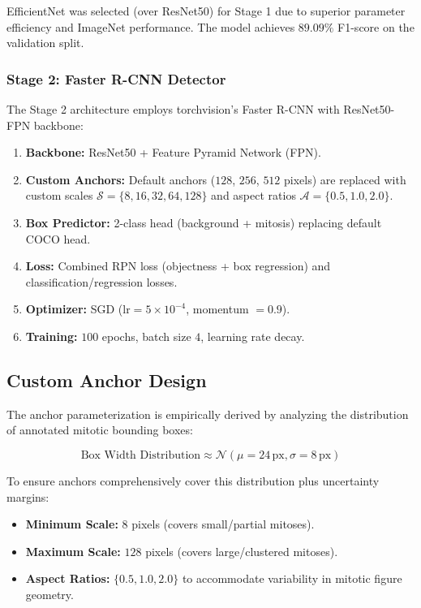\documentclass[journal]{IEEEtran}
\begin{document}
EfficientNet was selected (over ResNet50) for Stage 1 due to superior parameter efficiency and ImageNet performance. The model achieves $89.09\%$ F1-score on the validation split.

\subsubsection{Stage 2: Faster R-CNN Detector}
The Stage 2 architecture employs torchvision's Faster R-CNN with ResNet50-FPN backbone:

\begin{enumerate}
\item \textbf{Backbone:} ResNet50 + Feature Pyramid Network (FPN).
\item \textbf{Custom Anchors:} Default anchors ($128$, $256$, $512$ pixels) are replaced with custom scales $\mathcal{S} = \{8, 16, 32, 64, 128\}$ and aspect ratios $\mathcal{A} = \{0.5, 1.0, 2.0\}$.
\item \textbf{Box Predictor:} 2-class head (background + mitosis) replacing default COCO head.
\item \textbf{Loss:} Combined RPN loss (objectness + box regression) and classification/regression losses.
\item \textbf{Optimizer:} SGD ($\text{lr} = 5 \times 10^{-4}$, momentum $= 0.9$).
\item \textbf{Training:} $100$ epochs, batch size $4$, learning rate decay.
\end{enumerate}

\subsection{Custom Anchor Design}
The anchor parameterization is empirically derived by analyzing the distribution of annotated mitotic bounding boxes:

\begin{equation}
\text{Box Width Distribution} \approx \mathcal{N}(\mu=24\,\text{px}, \sigma=8\,\text{px})
\end{equation}

To ensure anchors comprehensively cover this distribution plus uncertainty margins:
\begin{itemize}
\item \textbf{Minimum Scale:} $8$ pixels (covers small/partial mitoses).
\item \textbf{Maximum Scale:} $128$ pixels (covers large/clustered mitoses).
\item \textbf{Aspect Ratios:} $\{0.5, 1.0, 2.0\}$ to accommodate variability in mitotic figure geometry.
\end{itemize}
\end{document}
